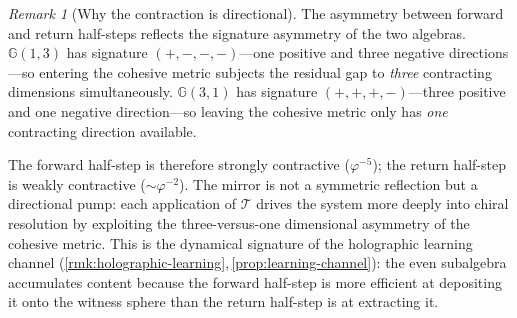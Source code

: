 \documentclass[11pt,a4paper]{article}
\theoremstyle{plain}
\theoremstyle{definition}
\theoremstyle{remark}
\newtheorem{remark}[theorem]{Remark}
\numberwithin{equation}{section}
\newcommand{\Cl}{\mathbb{G}}
\newcommand{\vp}{\varphi}
\begin{document}
\begin{remark}[Why the contraction is directional]
\label{rmk:directional-contraction}
The asymmetry between forward and return half-steps reflects the
signature asymmetry of the two algebras.  \(\Cl(1,3)\) has signature
\((+,-,-,-)\)---one positive and three negative directions---so
entering the cohesive metric subjects the residual gap to
\emph{three} contracting dimensions simultaneously.  \(\Cl(3,1)\) has
signature \((+,+,+,-)\)---three positive and one negative
direction---so leaving the cohesive metric only has \emph{one}
contracting direction available.

The forward half-step is therefore strongly contractive
(\(\vp^{-5}\)); the return half-step is weakly contractive
(\(\sim\vp^{-2}\)).  The mirror is not a symmetric reflection but a
directional pump: each application of \(\mathcal{T}\) drives the
system more deeply into chiral resolution by exploiting the
three-versus-one dimensional asymmetry of the cohesive metric.
This is the dynamical signature of the holographic learning channel
(\cref{rmk:holographic-learning},\,\cref{prop:learning-channel}):
the even subalgebra accumulates content because the forward
half-step is more efficient at depositing it onto the witness
sphere than the return half-step is at extracting it.
\end{remark}
\end{document}
